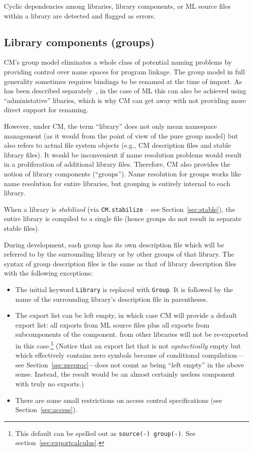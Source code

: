 Cyclic dependencies among libraries, library components, or ML source
files within a library are detected and flagged as errors.

\subsection{Library components (groups)}
\label{sec:groups}

CM's group model eliminates a whole class of potential naming problems
by providing control over name spaces for program linkage.  The group
model in full generality sometimes requires bindings to be renamed at
the time of import. As has been described
separately~\cite{blume:appel:cm99}, in the case of ML this can also be
achieved using ``administative'' libaries, which is why CM can get
away with not providing more direct support for renaming.

However, under CM, the term ``library'' does not only mean namespace
management (as it would from the point of view of the pure group
model) but also refers to actual file system objects (e.g., CM
description files and stable library files).  It would be inconvenient
if name resolution problems would result in a proliferation of
additional library files.  Therefore, CM also provides the notion of
library components (``groups'').  Name resolution for groups works
like name resolution for entire libraries, but grouping is entirely
internal to each library.

When a library is {\em stabilized} (via {\tt CM.stabilize} -- see
Section~\ref{sec:stable}), the entire library is compiled to a single
file (hence groups do not result in separate stable files).

During development, each group has its own description file which will
be referred to by the surrounding library or by other groups of that
library. The syntax of group description files is the same as that of
library description files with the following exceptions:

\begin{itemize}
\item The initial keyword {\tt Library} is replaced with {\tt Group}.
It is followed by the name of the surrounding library's description
file in parentheses.
\item The export list can be left empty, in which case CM will provide
a default export list: all exports from ML source files plus all
exports from subcomponents of the component. from other libraries will
not be re-exported in this case.\footnote{This default can be spelled
out as {\tt source(-) group(-)}.  See
section~\ref{sec:exportcalculus}.}  (Notice that an export list that
is not {\em syntactically} empty but which effectively contains zero
symbols because of conditional compilation---see
Section~\ref{sec:preproc}---does not count as being ``left empty'' in
the above sense.  Instead, the result would be an almost certainly
useless component with truly no exports.)
\item There are some small restrictions on access control
specifications (see Section~\ref{sec:access}).
\end{itemize}

